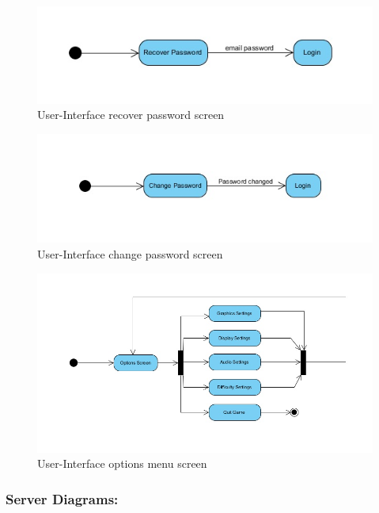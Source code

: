 \documentclass[letterpaper]{article}
\begin{document}
					\begin{figure}[H]
					\centering
					\includegraphics[width=180mm]{UML_Diagram/Activity/recoverpassword.jpg}
					\caption{User-Interface recover password screen}
					\label{overflow}
					\end{figure}
					
					\begin{figure}[H]
					\centering
					\includegraphics[width=180mm]{UML_Diagram/Activity/changepassword.jpg}
					\caption{User-Interface change password screen}
					\label{overflow}
					\end{figure}
					
					\begin{figure}[H]
					\centering
					\includegraphics[width=180mm]{UML_Diagram/Activity/optionsscreen.jpg}
					\caption{User-Interface options menu screen}
					\label{overflow}
					\end{figure}
				
				\subsubsection*{Server Diagrams:}
				\vspace{0.1in}
				
\end{document}
